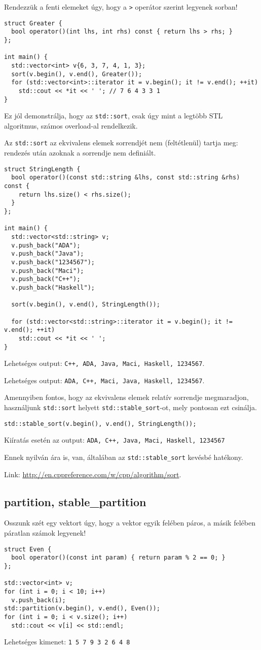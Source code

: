 \documentclass[../cpp_book/cpp_book.tex]{subfiles}
\begin{document}
	\medskip
	Rendezzük a fenti elemeket úgy, hogy a \texttt{>} operátor szerint legyenek sorban!
	\begin{lstlisting}
struct Greater {
  bool operator()(int lhs, int rhs) const { return lhs > rhs; }
};

int main() {
  std::vector<int> v{6, 3, 7, 4, 1, 3};
  sort(v.begin(), v.end(), Greater());
  for (std::vector<int>::iterator it = v.begin(); it != v.end(); ++it)
    std::cout << *it << ' '; // 7 6 4 3 3 1
}
	\end{lstlisting}
	\begin{note}
		Ez jól demonstrálja, hogy az \texttt{std::sort}, csak úgy mint a legtöbb STL algoritmus, számos overload-al rendelkezik.
	\end{note}
	Az \texttt{std::sort} az ekvivalens elemek sorrendjét nem (feltétlenül) tartja meg: rendezés után azoknak a sorrendje nem definiált.
	\begin{lstlisting}
struct StringLength {
  bool operator()(const std::string &lhs, const std::string &rhs) const {
    return lhs.size() < rhs.size();
  }
};

int main() {
  std::vector<std::string> v;
  v.push_back("ADA");
  v.push_back("Java");
  v.push_back("1234567");
  v.push_back("Maci");
  v.push_back("C++");
  v.push_back("Haskell");

  sort(v.begin(), v.end(), StringLength());

  for (std::vector<std::string>::iterator it = v.begin(); it != v.end(); ++it)
    std::cout << *it << ' ';
}
	\end{lstlisting}
	Lehetséges output: \texttt{C++, ADA, Java, Maci, Haskell, 1234567}.
	
	Lehetséges output: \texttt{ADA, C++, Maci, Java, Haskell, 1234567}.
	
	Amennyiben fontos, hogy az ekvivalens elemek relatív sorrendje megmaradjon, használjunk \texttt{std::sort} helyett \texttt{std::stable\_sort}-ot, mely pontosan ezt csinálja.
	\begin{lstlisting}
std::stable_sort(v.begin(), v.end(), StringLength());
	\end{lstlisting}
	Kiíratás esetén az output: \texttt{ADA, C++, Java, Maci, Haskell, 1234567}
	\begin{note}
		Ennek nyilván ára is, van, általában az \texttt{std::stable\_sort} kevésbé hatékony.
	\end{note}
	Link: \url{http://en.cppreference.com/w/cpp/algorithm/sort}.
	\subsection{partition, stable\_partition}
	Osszunk szét egy vektort úgy, hogy a vektor egyik felében páros, a másik felében páratlan számok legyenek!
	\begin{lstlisting}
struct Even {
  bool operator()(const int param) { return param % 2 == 0; }
};

std::vector<int> v;
for (int i = 0; i < 10; i++)
  v.push_back(i);
std::partition(v.begin(), v.end(), Even());
for (int i = 0; i < v.size(); i++)
  std::cout << v[i] << std::endl;
	\end{lstlisting}
	Lehetséges kimenet: \texttt{1 5 7 9 3 2 6 4 8}
	
\end{document}
